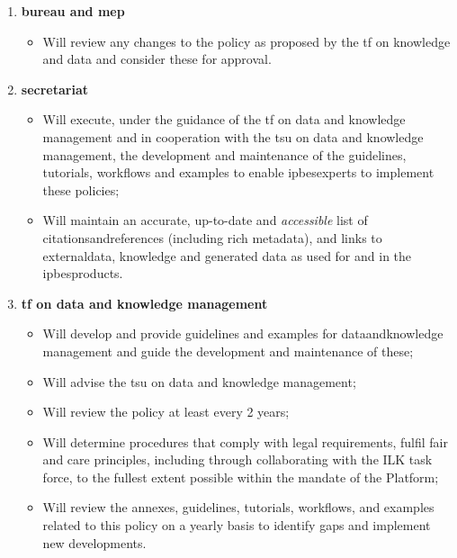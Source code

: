\documentclass{article}
\begin{document}
\begin{enumerate}[label=(\alph*)]
    \item \textbf{\gls{bureau} and \gls{mep}}
    \begin{itemize}
        \item Will review any changes to the policy as proposed by the \gls{tf} on knowledge and data and consider these for approval.
    \end{itemize}

    \item \textbf{\gls{secretariat}}
    \begin{itemize}
        \item Will execute, under the guidance of the \gls{tf} on data and knowledge management and in cooperation with the  \gls{tsu} on data and knowledge management, the development and maintenance of the guidelines, tutorials, \glspl{workflow} and examples to enable \glspl{ipbesexpert} to implement these policies;
        \item Will maintain an accurate, up-to-date and \textit{accessible} list of \gls{citationsandreferences} (including rich metadata), and links to \gls{externaldata}, \gls{knowledge} and generated \gls{data} as used for and in the \glspl{ipbesproduct}.
    \end{itemize}

    \item \textbf{\gls{tf} on data and knowledge management}
    \begin{itemize}
        \item Will develop and provide guidelines and examples for \gls{dataandknowledge} management and guide the development and maintenance of these;
        \item Will advise the \gls{tsu} on data and knowledge management;
        \item Will review the policy at least every 2 years;
        \item Will determine procedures that comply with legal requirements, fulfil \gls{fair} and \gls{care} principles, including through collaborating with the ILK task force, to the fullest extent possible within the mandate of the Platform;
        \item Will review the annexes, guidelines, tutorials, \glspl{workflow}, and examples related to this policy on a yearly basis to identify gaps and implement new developments.
    \end{itemize}


\end{enumerate}
\end{document}
